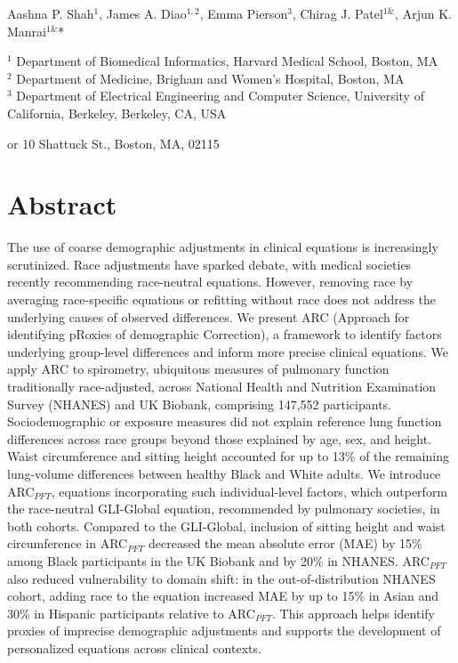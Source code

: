 \documentclass[10pt]{extarticle}
\begin{document}
\vspace{1.0em}


\noindent Aashna P. Shah$^{1}$, James A. Diao$^{1,2}$, Emma Pierson$^{3}$, Chirag J. Patel$^{1\&}$, Arjun K. Manrai$^{1\&}$*

$^{1}$ Department of Biomedical Informatics, Harvard Medical School, Boston, MA\\
$^{2}$ Department of Medicine, Brigham and Women's Hospital, Boston, MA\\
$^{3}$ Department of Electrical Engineering and Computer Science, University of California, Berkeley, Berkeley, CA, USA

 or 10 Shattuck St., Boston, MA, 02115

\section{Abstract}\label{abstract}

The use of coarse demographic adjustments in clinical equations is increasingly scrutinized. Race adjustments have sparked debate, with medical societies recently recommending race-neutral equations. However, removing race by averaging race-specific equations or refitting without race does not address the underlying causes of observed differences. We present ARC (Approach for identifying pRoxies of demographic Correction), a framework to identify factors underlying group-level differences and inform more precise clinical equations. We apply ARC to spirometry, ubiquitous measures of pulmonary function traditionally race-adjusted, across National Health and Nutrition Examination Survey (NHANES) and UK Biobank, comprising 147,552 participants. Sociodemographic or exposure measures did not explain reference lung function differences across race groups beyond those explained by age, sex, and height. Waist circumference and sitting height accounted for up to 13\% of the remaining lung-volume differences between healthy Black and White adults. We introduce ARC$_{PFT}$, equations incorporating such individual-level factors, which outperform the race-neutral GLI-Global equation, recommended by pulmonary societies, in both cohorts. Compared to the GLI-Global, inclusion of sitting height and waist circumference in ARC$_{PFT}$ decreased the mean absolute error (MAE) by 15\% among Black participants in the UK Biobank and by 20\% in NHANES. ARC$_{PFT}$ also reduced vulnerability to domain shift: in the out-of-distribution NHANES cohort, adding race to the equation increased MAE by up to 15\% in Asian and 30\% in Hispanic participants relative to ARC$_{PFT}$. This approach helps identify proxies of imprecise demographic adjustments and supports the development of personalized equations across clinical contexts.
\end{document}
